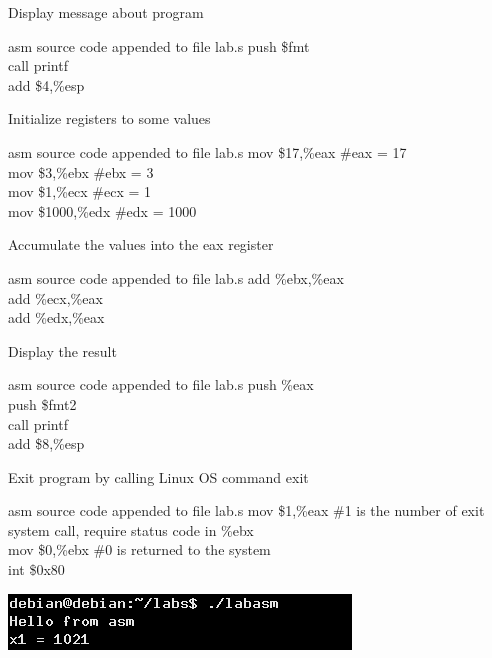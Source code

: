 \documentclass{article}
\begin{document}
Display message about program
\begin{GFT}{asm source code appended to file lab.s}
\+push \$fmt\\
\+call printf\\
\+add \$4,\%esp\\
\end{GFT}
Initialize registers to some values
\begin{GFT}{asm source code appended to file lab.s}
\+mov \$17,\%eax    \#eax = 17\\
\+mov \$3,\%ebx     \#ebx = 3\\
\+mov \$1,\%ecx     \#ecx = 1\\
\+mov \$1000,\%edx  \#edx = 1000\\
\end{GFT}
Accumulate the values into the eax register
\begin{GFT}{asm source code appended to file lab.s}
\+add \%ebx,\%eax\\
\+add \%ecx,\%eax\\
\+add \%edx,\%eax\\
\end{GFT}
Display the result
\begin{GFT}{asm source code appended to file lab.s}
\+push \%eax\\
\+push \$fmt2\\
\+call printf\\
\+add \$8,\%esp\\
\end{GFT}
Exit program by calling Linux OS command exit
\begin{GFT}{asm source code appended to file lab.s}
\+mov \$1,\%eax \#1 is the number of exit system call, require status code in \%ebx\\
\+mov \$0,\%ebx \#0 is returned to the system\\
\+int \$0x80\\
\end{GFT}
\includegraphics{labasm.png}
\end{document}
